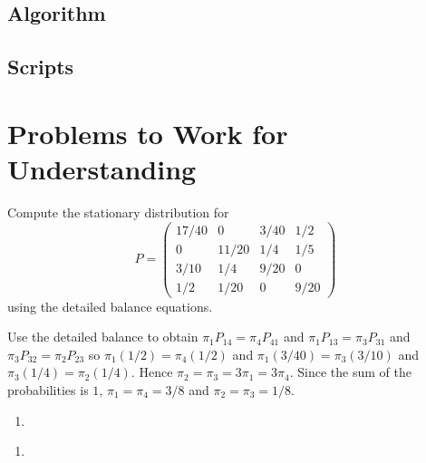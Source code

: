 \documentclass[12pt]{article}
\begin{document}
\subsection*{Algorithm}

\subsection*{Scripts}



\hr

\section*{Problems to Work for Understanding}
\renewcommand{\theexerciseseries}{}
\renewcommand{\theexercise}{\arabic{exercise}}

\begin{exercise}
  Compute the stationary distribution for
  \[
    P =
    \begin{pmatrix}
      17/40 & 0 & 3/40 & 1/2 \\
      0     & 11/20 & 1/4 & 1/5 \\
      3/10  & 1/4   & 9/20 & 0 \\
      1/2   & 1/20  & 0    & 9/20
    \end{pmatrix}
  \]
  using the detailed balance equations.
\end{exercise}
\begin{solution}
  Use the detailed balance to obtain $\pi_1P_{14} = \pi_4P_{41}$ and $\pi_1P_{13} = \pi_3P_{31}$
and $\pi_3P_{32} = \pi_2P_{23}$ so $\pi_1(1/2) = \pi_4(1/2)$ and $\pi_1(3/40) = \pi_3(3/10)$ and $\pi_3(1/4) = \pi_2(1/4)$.
Hence $\pi_2 = \pi_3 = 3\pi_1 = 3\pi_4$. Since the sum of the probabilities is $1$,
$\pi_1 = \pi_4 = 3/8$ and $\pi_2 = \pi_3 = 1/8$.
\end{solution}

\begin{exercise}
  \begin{enumerate}[label=(\alpha*)]
  \item 
  \end{enumerate}
\end{exercise}
\begin{solution}
  \begin{enumerate}[label=(\alpha*)]
  \item 
  \end{enumerate}
\end{solution}
\end{document}
